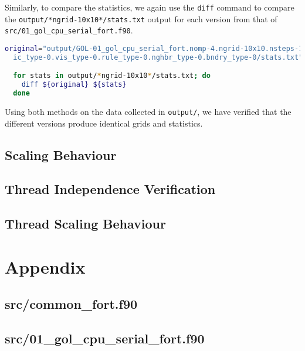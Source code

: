 \documentclass[]{article}
\begin{document}
Similarly, to compare the statistics, we again use the \lstinline{diff} command
to compare the \lstinline[style=ff]{output/*ngrid-10x10*/stats.txt} output
for each version from that of
\lstinline[style=ff]{src/01_gol_cpu_serial_fort.f90}.
\begin{lstlisting}[language=Bash]
  original="output/GOL-01_gol_cpu_serial_fort.nomp-4.ngrid-10x10.nsteps-10.\
  ic_type-0.vis_type-0.rule_type-0.nghbr_type-0.bndry_type-0/stats.txt"

  for stats in output/*ngrid-10x10*/stats.txt; do
    diff ${original} ${stats}
  done
\end{lstlisting}

Using both methods on the data collected in \lstinline[style=ff]{output/}, we
have verified that the different versions produce identical grids and
statistics.

\subsection{Scaling Behaviour}
\label{sec:scaling-behaviour}

\subsection{Thread Independence Verification}
\label{sec:thre-indep-verif}

\subsection{Thread Scaling Behaviour}
\label{sec:thread-scaling-behaviour}

\newpage
\appendix
\section{Appendix}
\label{sec:appendix}

\subsection{src/common\_fort.f90}
\label{sec:common_fort}



\newpage
\subsection{src/01\_gol\_cpu\_serial\_fort.f90}
\label{sec:01_gol_cpu_serial_fort}
\end{document}
